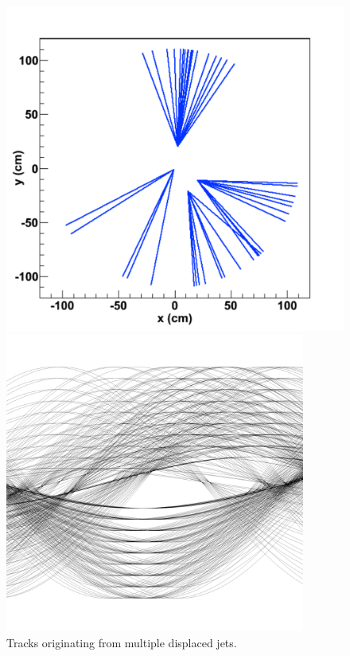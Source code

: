 \documentclass{JINST}
\begin{document}
\begin{figure}[!Hhtb]
\begin{minipage}[t]{4.9cm}
\begin{center}
	\includegraphics[width=1.\textwidth]{figs/jet2/tracks.pdf}
	\caption{Tracks originating from multiple displaced jets. \label{fig:jet2_tracks}}
	\end{center}
\end{minipage}
\begin{minipage}[t]{4.9cm}
\begin{center}
	\includegraphics[width=0.88\textwidth]{figs/jet2/accumulator.pdf}

\end{center}
\end{minipage}
\end{figure}
\end{document}
